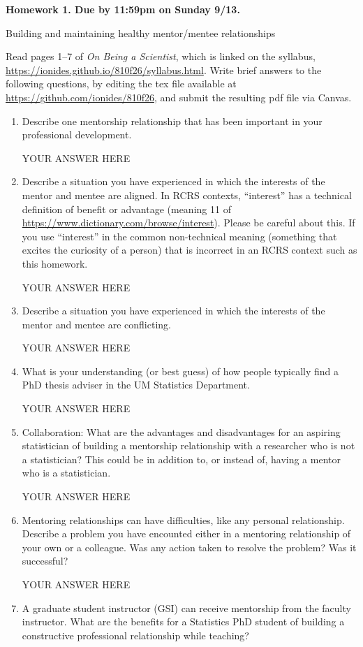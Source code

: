 \documentclass[12pt]{article}
\begin{document}
\begin{center}{\bf
Homework 1. Due by 11:59pm on Sunday 9/13.

Building and maintaining healthy mentor/mentee relationships
}\end{center}

Read pages 1--7 of {\em On Being a Scientist}, which is linked on the syllabus, \url{https://ionides.github.io/810f26/syllabus.html}. Write brief answers to the following questions, by editing the tex file available at \url{https://github.com/ionides/810f26}, and submit the resulting pdf file via Canvas. 

\begin{enumerate}
\item Describe one mentorship relationship that has been important in your professional development.

YOUR ANSWER HERE

\item Describe a situation you have experienced in which the interests of the mentor and mentee are aligned. In RCRS contexts, ``interest'' has a technical definition of benefit or advantage (meaning 11 of \url{https://www.dictionary.com/browse/interest}). Please be careful about this. If you use ``interest'' in the common non-technical meaning (something that excites the curiosity of a person) that is incorrect in an RCRS context such as this homework.

YOUR ANSWER HERE

\item Describe a situation you have experienced in which the interests of the mentor and mentee are conflicting. 

YOUR ANSWER HERE

\item What is your understanding (or best guess) of how people typically find a PhD thesis adviser in the UM Statistics Department.

YOUR ANSWER HERE

\item Collaboration: What are the advantages and disadvantages for an aspiring statistician of building a mentorship relationship with a researcher who is not a statistician? This could be in addition to, or instead of, having a mentor who is a statistician.

YOUR ANSWER HERE

\item Mentoring relationships can have difficulties, like any personal relationship. Describe a problem you have encounted either in a mentoring relationship of your own or a colleague. Was any action taken to resolve the problem? Was it successful?

YOUR ANSWER HERE

\item A graduate student instructor (GSI) can receive mentorship from the faculty instructor. What are the benefits for a Statistics PhD student of building a constructive professional relationship while teaching?
  
\end{enumerate}
\end{document}

